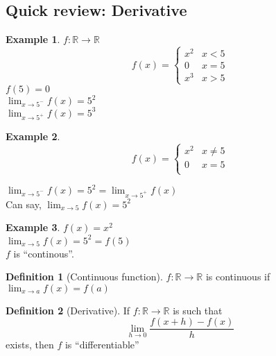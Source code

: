 \documentclass[twocolumn,20pt,fleqn]{extarticle}
\theoremstyle{plain}
\theoremstyle{definition}
\newtheorem*{definition}{Definition}
\newtheorem*{example}{Example}
\theoremstyle{remark}
\begin{document}
\subsection{Quick review: Derivative}
\begin{example}
  $f : \mathbb{R}\to \mathbb{R}$
  \[f(x) =
      \begin{cases}
        x^2 & x < 5\\
        0 & x = 5\\
        x^3 & x > 5
      \end{cases}
      \]
      $f(5)=0$\\
$\displaystyle\lim_{x \to 5^-} f(x)  = 5^2$\\
$\displaystyle\lim_{x \to 5^+} f(x)  = 5^3$
\end{example}


\begin{example}
  \[f(x) =
      \begin{cases}
        x^2 & x  \neq  5\\
        0 & x = 5\\
        
      \end{cases}
      \]
      
      


$\displaystyle\lim_{x \to 5^-} f(x) = 5^2  = \displaystyle\lim_{x \to 5^+} f(x)$\\
Can say, $\displaystyle\lim_{x \to 5} f(x) = 5^2$
\end{example}

\newpage
\begin{example}
$f(x) = x^2$\\
$\displaystyle\lim_{x \to 5} f(x) = 5^2 = f(5)$\\
$f$ is ``continous''.
\end{example}

\begin{definition}[Continuous function]
$f : \mathbb{R} \to \mathbb{R}$ is continuous if $\displaystyle\lim_{x \to a} f(x) = f(a)$
\end{definition}

\begin{definition}[Derivative]
  If $f : \mathbb{R}\to \mathbb{R}$ is such that
  \[\displaystyle\lim_{h\to 0}\frac{f(x+h) - f(x)}{h}\] exists, then $f$ is ``differentiable''\end{definition}


\clearpage
\end{document}
